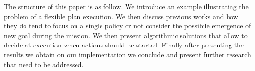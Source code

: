 The structure of this paper is as follow. We introduce an example
illustrating the problem of a flexible plan execution. We then discuss
previous works and how they do tend to focus on a single policy or not
consider the possibile emergence of new goal during the mission. We
then present algorithmic solutions that allow to decide at execution
when actions should be started. Finally after presenting the results
we obtain on our implementation we conclude and present further
research that need to be addressed.




	
